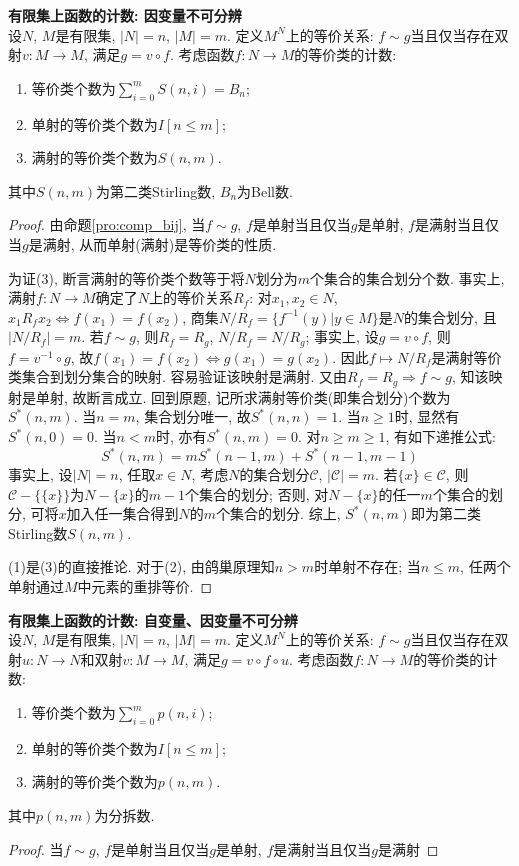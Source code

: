 \begin{pro}\textbf{有限集上函数的计数: 因变量不可分辨}\\
设$N$, $M$是有限集, $|N|=n$, $|M|=m$. 定义$M^N$上的等价关系: $f\sim g$当且仅当存在双射$v: M\to M$, 满足$g = v \circ f$. 考虑函数$f:N\to M$的等价类的计数:
\begin{enumerate}
\item 等价类个数为$\sum_{i=0}^m S(n,i)=B_n$;
\item 单射的等价类个数为$I[n\le m]$;
\item 满射的等价类个数为$S(n,m)$.
\end{enumerate}
其中$S(n,m)$为第二类Stirling数, $B_n$为Bell数. 
\label{pro:12fold-3}
\end{pro}
\begin{proof} 由命题\ref{pro:comp_bij}, 当$f\sim g$, $f$是单射当且仅当$g$是单射, $f$是满射当且仅当$g$是满射, 从而单射(满射)是等价类的性质. 
\par 为证(3), 断言满射的等价类个数等于将$N$划分为$m$个集合的集合划分个数. 事实上, 满射$f:N\to M$确定了$N$上的等价关系$R_f$: 对$x_1,x_2\in N$, $x_1R_fx_2\iff f(x_1)=f(x_2)$, 商集$N/R_f=\{f^{-1}(y)\vert y\in M\}$是$N$的集合划分, 且$|N/R_f|=m$. 若$f \sim g$, 则$R_f=R_g$, $N/R_f = N/R_g$; 事实上, 设$g=v\circ f$, 则$f = v^{-1}\circ g$, 故$f(x_1)=f(x_2) \iff g(x_1)=g(x_2)$. 因此$f\mapsto N/R_f$是满射等价类集合到划分集合的映射. 容易验证该映射是满射. 又由$R_f=R_g\Rightarrow f\sim g$, 知该映射是单射, 故断言成立. 回到原题, 记所求满射等价类(即集合划分)个数为$S^*(n,m)$. 当$n=m$, 集合划分唯一, 故$S^*(n,n)=1$. 当$n\ge 1$时, 显然有$S^*(n,0)=0$. 当$n<m$时, 亦有$S^*(n,m)=0$. 对$n\ge m\ge 1$, 有如下递推公式:
\begin{equation*}
    S^*(n,m) = mS^*(n-1,m)+S^*(n-1,m-1)
\end{equation*}
事实上, 设$|N|=n$, 任取$x\in N$, 考虑$N$的集合划分$\mathcal{C}$, $|\mathcal{C}|=m$. 若$\{x\}\in \mathcal{C}$, 则$\mathcal{C} - \{\{x\}\}$为$N-\{x\}$的$m-1$个集合的划分; 否则, 对$N - \{x\}$的任一$m$个集合的划分, 可将$x$加入任一集合得到$N$的$m$个集合的划分. 综上, $S^*(n,m)$即为第二类Stirling数$S(n,m)$. 
\par (1)是(3)的直接推论. 对于(2), 由鸽巢原理知$n>m$时单射不存在; 当$n\le m$, 任两个单射通过$M$中元素的重排等价. 
\end{proof}

\begin{pro}\textbf{有限集上函数的计数: 自变量、因变量不可分辨}\\
设$N$, $M$是有限集, $|N|=n$, $|M|=m$. 定义$M^N$上的等价关系: $f\sim g$当且仅当存在双射$u:N\to N$和双射$v: M\to M$, 满足$g = v \circ f \circ u$. 考虑函数$f:N\to M$的等价类的计数:
\begin{enumerate}
\item 等价类个数为$\sum_{i=0}^m p(n,i)$;
\item 单射的等价类个数为$I[n\le m]$;
\item 满射的等价类个数为$p(n,m)$.
\end{enumerate}
其中$p(n,m)$为分拆数. 
\label{pro:12fold-4}
\end{pro} 
\begin{proof}
    当$f\sim g$, $f$是单射当且仅当$g$是单射, $f$是满射当且仅当$g$是满射
\end{proof}

